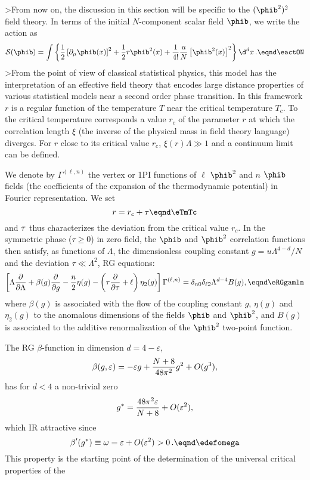 >From now on, the discussion in this section will be specific to the
$(\phib^2)^2$ field theory. In terms of the initial $N$-component scalar field $\phib$,  we write
the action  as \sslbl\ssfivNi
$$ {\cal S} ( \phib )= \int \left\{{ 1 \over 2} \left[
\partial_{\mu} \phib (x) \right]^2+{1 \over 2}r
\phib^2 (x)+{1\over 4!} {u \over  N} \left[ \phib^2(x) \right]^2 \right\} \d ^{d}x\,.
\eqnd\eactON $$
>From the point of view of classical statistical physics, this model has the interpretation of an effective field theory that encodes large distance properties
of various statistical models near a second order phase transition. In this framework $r$ is a regular function of the temperature $T$ near the critical temperature $T_c$.  To the critical temperature corresponds a value $r_c$ of the parameter $r$ at which the correlation length $\xi$ (the inverse of the
physical mass in field theory language) diverges. For $r$ close to its critical value $r_c$, $\xi(r)\Lambda\gg 1$ and  a
continuum limit can be defined.
\par
We denote by $ \Gamma^{(\ell,n)}$ the vertex or 1PI functions of $\ell$
$\phib^2$ and $n$ $\phib$ fields (the coefficients of the expansion of the
thermodynamic potential) in Fourier representation. We set
$$  r=r_c+ \tu  \eqnd\eTmTc $$
and  $\tau$ thus characterizes the deviation from the critical value $r_c$.
In the symmetric phase ($\tau \ge0$) in zero field, the $\phib$ and $\phib^2$ correlation functions then satisfy, as functions of $\Lambda$, the dimensionless
coupling constant $g=u\Lambda^{4-d}/N$ and the deviation $\tau \ll \Lambda^2$, RG equations:
$$ \left[ \Lambda{ \partial \over \partial
\Lambda} +\beta(g){\partial \over \partial g}-{n \over 2}\eta(g)-\left(\tau{\partial \over\partial  \tau}+\ell\right)\eta_2
(g) \right] \Gamma^{(\ell,n)} =\delta_{n0}\delta_{\ell2} \Lambda^{d-4}B(g),
\eqnd\eRGgamln $$
where $\beta(g)$ is associated with the flow of the coupling constant $g$,
$\eta(g)$ and $\eta_2(g)$ to the anomalous dimensions of the fields $\phib$
and $\phib^2$, and $B(g)$ is associated to the additive renormalization of the $\phib^2$
two-point function. \par
The RG $\beta$-function in dimension $d=4-\varepsilon$,
$$\beta(g,\varepsilon)=-\varepsilon g+{N+8 \over 48\pi^2}g^2+O(g^3), $$
has for $d<4$ a non-trivial   zero
$$ g^*={48\pi^2\varepsilon\over N+8}+O(\varepsilon^2) , $$
which IR attractive since
$$\beta'(g^*)\equiv \omega =\varepsilon+O(\varepsilon^2)>
0\,.\eqnd\edefomega $$
This property is the starting point of the determination of the universal critical properties of the
